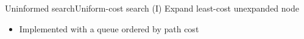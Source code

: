 \documentclass[10pt,compress]{beamer} %
\begin{document}
\begin{frame}{Uninformed search}{Uniform-cost search (I)}
    Expand least-cost unexpanded node
    \begin{itemize}
        \item Implemented with a queue ordered by path cost
    \end{itemize}

    \begin{columns}
                \setlength{\fboxrule}{0pt}
                \setlength{\fboxrule}{0pt}
    \end{columns}
\end{frame}
\end{document}
